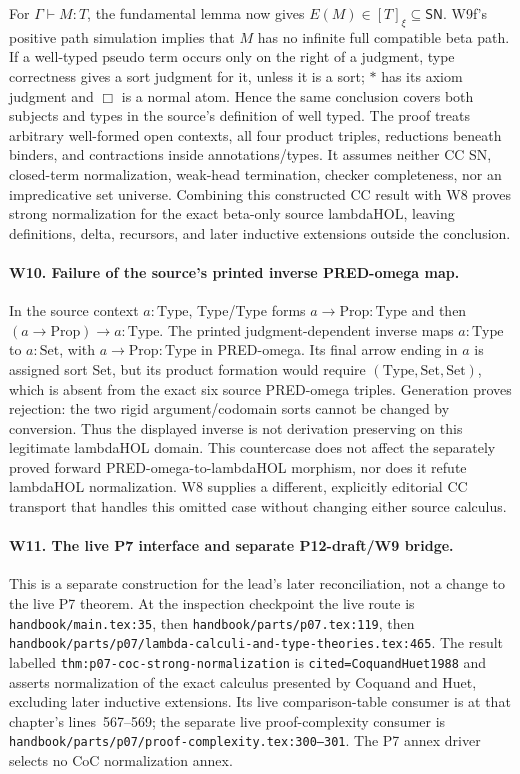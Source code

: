 For \(\Gamma\vdash M:T\), the fundamental lemma now gives
\(E(M)\in[T]_\xi\subseteq\mathsf{SN}\). W9f's positive path
simulation implies that \(M\) has no infinite full compatible beta
path. If a well-typed pseudo term occurs only on the right of a judgment,
type correctness gives a sort judgment for it, unless it is a sort;
\(\ast\) has its axiom judgment and \(\Box\) is a normal atom.
Hence the same conclusion covers both subjects and types in the
source's definition of well typed. The proof treats arbitrary well-formed
open contexts, all four product triples, reductions beneath binders,
and contractions inside annotations/types. It assumes neither CC SN,
closed-term normalization, weak-head termination, checker completeness,
nor an impredicative set universe. Combining this constructed CC result
with W8 proves strong normalization for the exact beta-only source
lambdaHOL, leaving definitions, delta, recursors, and later inductive
extensions outside the conclusion.

\paragraph{W10. Failure of the source's printed inverse PRED-omega map.}
In the source context \(a:\mathrm{Type}\), Type/Type forms
\(a\to\mathrm{Prop}:\mathrm{Type}\) and then
\((a\to\mathrm{Prop})\to a:\mathrm{Type}\).
The printed judgment-dependent inverse maps \(a:\mathrm{Type}\)
to \(a:\mathrm{Set}\), with \(a\to\mathrm{Prop}:\mathrm{Type}\)
in PRED-omega. Its final arrow ending in \(a\) is assigned sort Set,
but its product formation would require
\((\mathrm{Type},\mathrm{Set},\mathrm{Set})\), which is absent from
the exact six source PRED-omega triples. Generation proves rejection:
the two rigid argument/codomain sorts cannot be changed by conversion.
Thus the displayed inverse is not derivation preserving on this legitimate
lambdaHOL domain. This countercase does not affect the separately proved
forward PRED-omega-to-lambdaHOL morphism, nor does it refute lambdaHOL
normalization. W8 supplies a different, explicitly editorial CC transport
that handles this omitted case without changing either source calculus.

\paragraph{W11. The live P7 interface and separate P12-draft/W9 bridge.}
This is a separate construction for the lead's later reconciliation, not
a change to the live P7 theorem. At the inspection checkpoint the live
route is \texttt{handbook/main.tex:35}, then
\texttt{handbook/parts/p07.tex:119}, then
\texttt{handbook/parts/p07/lambda-calculi-and-type-theories.tex:465}.
The result labelled \texttt{thm:p07-coc-strong-normalization} is
\texttt{cited=CoquandHuet1988} and asserts normalization of the exact
calculus presented by Coquand and Huet, excluding later inductive
extensions. Its live comparison-table consumer is at that chapter's
lines~567--569; the separate live proof-complexity consumer is
\texttt{handbook/parts/p07/proof-complexity.tex:300--301}.
The P7 annex driver selects no CoC normalization annex.

